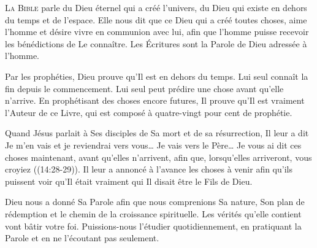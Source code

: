 


\lettrine{L}{a Bible} parle du Dieu éternel qui a créé l'univers,
 du Dieu qui existe en dehors du temps et de l'espace.
 Elle nous dit que ce Dieu qui a créé toutes choses,
 aime l'homme et désire vivre en communion avec lui,
 afin que l'homme puisse recevoir les bénédictions de Le connaître.
 Les Écritures sont la Parole de Dieu adressée à l'homme.


Par les prophéties, Dieu prouve qu'Il est en dehors du temps.
 Lui seul connaît la fin depuis le commencement.
 Lui seul peut prédire une chose avant qu'elle n'arrive.
 En prophétisant des choses encore futures, Il prouve qu'Il est vraiment
 l'Auteur de ce Livre, qui est composé à quatre-vingt pour cent de prophétie. 

Quand Jésus parlait à Ses disciples de Sa mort et de sa résurrection,
 Il leur a dit\frcolon{} 
 \Og Je m'en vais et je reviendrai vers vous\dots{}
 Je vais vers le Père\dots{} Je vous ai dit ces choses maintenant,
 avant qu'elles n'arrivent, afin que, lorsqu'elles arriveront,
 vous croyiez \Fg{} ((14:28-29)).
 Il leur a annoncé à l'avance les choses à venir afin qu'ils puissent
 voir qu'Il était vraiment qui Il disait être \ocadr le Fils de Dieu. 

Dieu nous a donné Sa Parole afin que nous comprenions Sa nature,
 Son plan de rédemption et le chemin de la croissance spirituelle.
 Les vérités qu'elle contient vont bâtir votre foi.
 Puissions-nous l'étudier quotidiennement, en pratiquant la Parole
 et en ne l'écoutant pas seulement.

\dvrule






